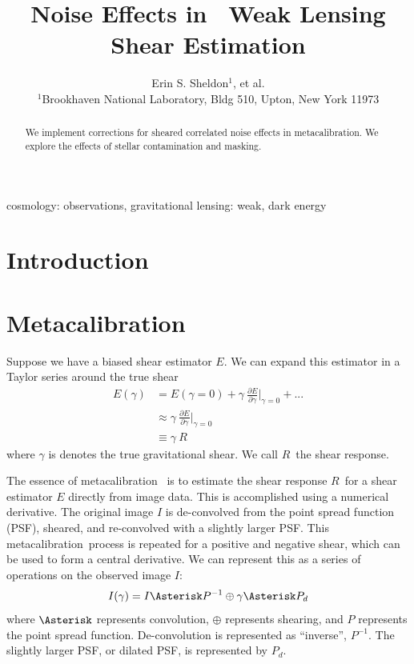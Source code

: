 \documentclass[usegraphicx,usenatbib]{mn2e}
\title{Noise Effects in \Mcal\ Weak Lensing Shear Estimation}
\author[Sheldon et al.]{Erin S. Sheldon$^1$, et al.\\
$^1$Brookhaven National Laboratory, Bldg 510, Upton, New York 11973}
\newcommand{\mcal}{metacalibration}
\newcommand{\mcalR}{$R$}
\begin{document}
\maketitle

\begin{abstract}

We implement corrections for sheared correlated noise effects in \mcal. We
explore the effects of stellar contamination and masking.   

\end{abstract}


\begin{keywords}                                                                    
    cosmology: observations,
    gravitational lensing: weak,
    dark energy
\end{keywords} 

\section{Introduction} \label{sec:intro}

\section{Metacalibration} \label{sec:algo}

Suppose we have a biased shear estimator $E$.  We can expand this estimator
in a Taylor series around the true shear
\begin{align}
    E(\gamma) &= E(\gamma=0) + \gamma ~ \frac{ \partial E }{ \partial \gamma }\bigg|_{\gamma=0}  + ... \nonumber \\
      & \approx  \gamma ~ \frac{ \partial E }{ \partial \gamma } \bigg|_{\gamma=0}  \\
      & \equiv  \gamma ~ \mbox{\mcalR} \nonumber
\end{align}
where $\gamma$ is denotes the true gravitational shear.  We call \mcalR\
the shear response.

The essence of \mcal\ \citep{HuffMcal} is to estimate the shear response
\mcalR\ for a shear estimator $E$ directly from image data.  This is
accomplished using a numerical derivative.  The original image $I$ is
de-convolved from the point spread function (PSF), sheared, and re-convolved
with a slightly larger PSF.  This \mcal\ process is repeated for a
positive and negative shear, which can be used to form a central derivative.
We can represent this as a series of operations on the observed image $I$:
\begin{equation}
    I(\gamma) = I \Asterisk P^{-1} \oplus \gamma \Asterisk P_{d}
\end{equation}
where $\Asterisk$ represents convolution, $\oplus$ represents shearing,
and $P$ represents the point spread function.  De-convolution
is represented as ``inverse'', $P^{-1}$.  The slightly larger PSF, or
dilated PSF, is represented by $P_{d}$.
\end{document}
